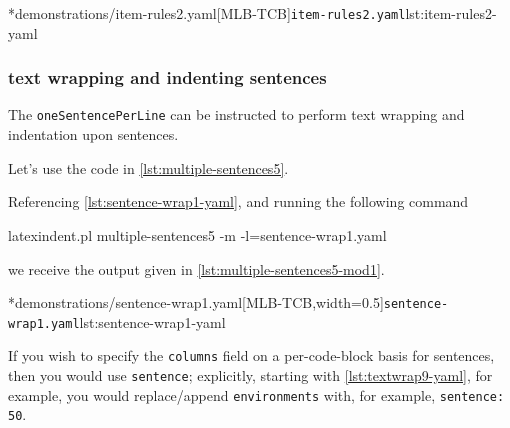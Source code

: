         \begin{cmhtcbraster}
		\cmhlistingsfromfile[style=yaml-LST]*{demonstrations/item-rules2.yaml}[MLB-TCB]{\texttt{item-rules2.yaml}}{lst:item-rules2-yaml}
        \end{cmhtcbraster}

\subsubsection{text wrapping and indenting sentences}
	The \texttt{oneSentencePerLine}%
	 can be instructed to perform
	text wrapping and indentation upon sentences.

	Let's use the code in \cref{lst:multiple-sentences5}.


	Referencing \cref{lst:sentence-wrap1-yaml}, and running the following command
	\begin{commandshell}
latexindent.pl multiple-sentences5 -m -l=sentence-wrap1.yaml
\end{commandshell}
	we receive the output given in \cref{lst:multiple-sentences5-mod1}.

        \begin{cmhtcbraster}[ raster left skip=-3.5cm,
                             raster right skip=-2cm,
            raster force size=false,
            raster column 1/.style={add to width=.1\textwidth},
                             raster column skip=.06\linewidth]
			\cmhlistingsfromfile[style=yaml-LST]*{demonstrations/sentence-wrap1.yaml}[MLB-TCB,width=0.5\textwidth]{\texttt{sentence-wrap1.yaml}}{lst:sentence-wrap1-yaml}
        \end{cmhtcbraster}

	If you wish to specify the \texttt{columns} field on a per-code-block basis
	for sentences, then you would use \texttt{sentence}; explicitly, starting with
	\vref{lst:textwrap9-yaml}, for example, you  would replace/append
	\texttt{environments} with, for example, \texttt{sentence: 50}.

